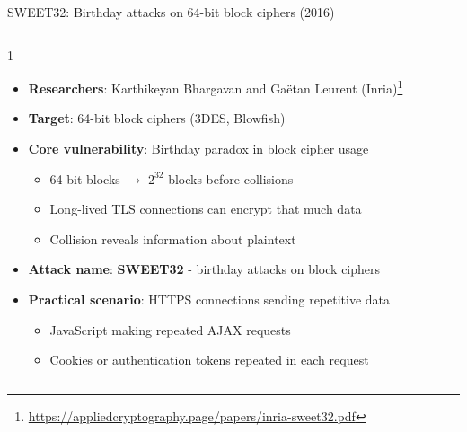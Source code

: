 \documentclass[aspectratio=169, lualatex, handout]{beamer}
\begin{document}
\begin{frame}{SWEET32: Birthday attacks on 64-bit block ciphers (2016)}
	\begin{columns}[c]
		\begin{column}{1\textwidth}
			\begin{itemize}[<+->]
				\item \textbf{Researchers}: Karthikeyan Bhargavan and Gaëtan Leurent (Inria)\footnote{\url{https://appliedcryptography.page/papers/inria-sweet32.pdf}}
				\item \textbf{Target}: 64-bit block ciphers (3DES, Blowfish)
				\item \textbf{Core vulnerability}: Birthday paradox in block cipher usage
				      \begin{itemize}
					      \item 64-bit blocks $\rightarrow$ $2^{32}$ blocks before collisions
					      \item Long-lived TLS connections can encrypt that much data
					      \item Collision reveals information about plaintext
				      \end{itemize}
				\item \textbf{Attack name}: \textbf{SWEET32} - birthday attacks on block ciphers
				\item \textbf{Practical scenario}: HTTPS connections sending repetitive data
				      \begin{itemize}
					      \item JavaScript making repeated AJAX requests
					      \item Cookies or authentication tokens repeated in each request
				      \end{itemize}
			\end{itemize}
		\end{column}
	\end{columns}
\end{frame}
\end{document}

